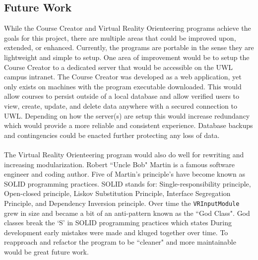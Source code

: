 \subsection{Future Work}
While the Course Creator and Virtual Reality Orienteering programs achieve the goals for this project, there are multiple areas that could be improved upon, extended, or enhanced. Currently, the programs are portable in the sense they are lightweight and simple to setup. One area of improvement would be to setup the Course Creator to a dedicated server that would be accessible on the UWL campus intranet. The Course Creator was developed as a web application, yet only exists on machines with the program executable downloaded. This would allow courses to persist outside of a local database and allow verified users to view, create, update, and delete data anywhere with a secured connection to UWL. Depending on how the server(s) are setup this would increase redundancy which would provide a more reliable and consistent experience. Database backups and contingencies could be enacted further protecting any loss of data.\\
\\
The Virtual Reality Orienteering program would also do well for rewriting and increasing modularization. Robert ``Uncle Bob" Martin is a famous software engineer and coding author. Five of Martin's principle's have become known as SOLID programming practices. SOLID stands for: Single-responsibility principle, Open-closed principle, Liskov Substitution Principle, Interface Segregation Principle, and Dependency Inversion principle. Over time the \lstinline{VRInputModule} grew in size and became a bit of an anti-pattern known as the ``God Class".  God classes break the `S' in SOLID programming practices which states  During development early mistakes were made and kluged together over time. To reapproach and refactor the program to be ``cleaner" and more maintainable would be great future work.
